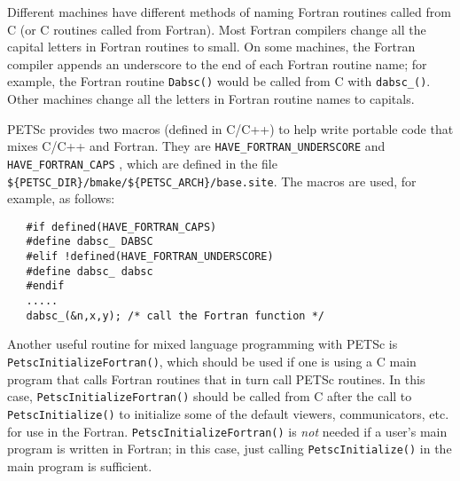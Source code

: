 
Different machines have
different methods of naming Fortran routines called from C 
(or C routines called from Fortran). Most Fortran compilers change
all the capital letters in Fortran routines to small. On some machines, the 
Fortran compiler appends an underscore to the end of each Fortran 
routine name; for example, the Fortran routine {\tt Dabsc()}
would be called from C with {\tt dabsc\_()}.  Other machines
change all the letters in Fortran routine names to capitals. 

PETSc provides two macros (defined in C/C++) to help write 
portable code that mixes C/C++ and Fortran. They are 
{\tt HAVE\_FORTRAN\_UNDERSCORE} and {\tt HAVE\_FORTRAN\_CAPS}
 ,
which are defined in the file {\tt \$\{PETSC\_DIR\}/bmake/\$\{PETSC\_ARCH\}/base.site}.
The macros are used, for example, as follows:
\begin{verbatim}
   #if defined(HAVE_FORTRAN_CAPS)
   #define dabsc_ DABSC
   #elif !defined(HAVE_FORTRAN_UNDERSCORE)
   #define dabsc_ dabsc
   #endif
   .....
   dabsc_(&n,x,y); /* call the Fortran function */
\end{verbatim}

Another useful routine for mixed language programming with PETSc is
{\tt PetscInitializeFortran()}, which should be used if one is using a
C main program that calls Fortran routines that in turn call PETSc
routines.  In this case, {\tt PetscInitializeFortran()} should be
called from C after the call to {\tt PetscInitialize()} to initialize
some of the default viewers, communicators, etc.  for use in the
Fortran.  {\tt PetscInitializeFortran()} is {\em not} needed if a
user's main program is written in Fortran; in this case, just calling
{\tt PetscInitialize()} in the main program is sufficient.

